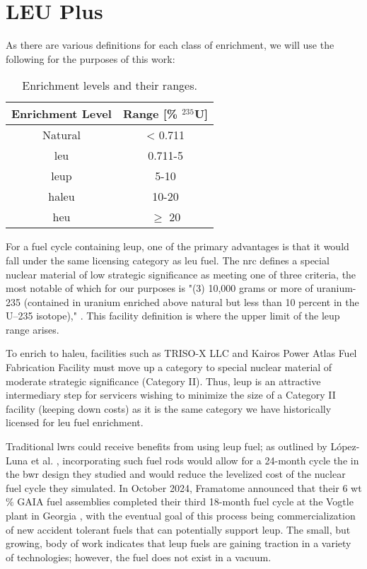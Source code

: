 \section{LEU Plus}
\label{sec:leup}

As there are various definitions for each class of enrichment, we will use the following for the purposes of this work:

\begin{table}[H]
   \centering
   \caption{Enrichment levels and their ranges.}
   \label{tab:enrichment_levels}
   \begin{tabular}{c c}
      \hline
      \textbf{Enrichment Level} & \textbf{Range [\%  $^{235}$U]} \\
      \hline
      Natural & < 0.711 \\
      \gls{leu} & 0.711-5 \\
      \gls{leup} & 5-10 \\
      \gls{haleu} & 10-20 \\
      \gls{heu} & $\geq$ 20  \\
      \hline
   \end{tabular}
\end{table}

For a fuel cycle containing \gls{leup}, one of the primary advantages is that it would fall under the same licensing category as \gls{leu} fuel. The \gls{nrc} defines a special nuclear material of low strategic significance \cite{nrc_catiii} as meeting one of three criteria, the most notable of which for our purposes is "(3) 10,000 grams or more of uranium-235 (contained in uranium enriched above natural but less than 10 percent in the U–235 isotope)," \cite{nrc_catiii}. This facility definition is where the upper limit of the \gls{leup} range arises.

To enrich to \gls{haleu}, facilities such as TRISO-X LLC and Kairos Power Atlas Fuel Fabrication Facility must move up a category to special nuclear material of moderate strategic significance (Category II). Thus, \gls{leup} is an attractive intermediary step for servicers wishing to minimize the size of a Category II facility (keeping down costs) as it is the same category we have historically licensed for \gls{leu} fuel enrichment.

Traditional \glspl{lwr} could receive benefits from using \gls{leup} fuel; as outlined by L\'{o}pez-Luna et al. \cite{24_month_cycle_bwr}, incorporating such fuel rods would allow for a 24-month cycle the in the \gls{bwr} design they studied and would reduce the levelized cost of the nuclear fuel cycle they simulated. In October 2024, Framatome announced that their 6 wt$\%$ GAIA fuel assemblies completed their third 18-month fuel cycle at the Vogtle plant in Georgia \cite{framatome_press_2024}, with the eventual goal of this process being commercialization of new accident tolerant fuels that can potentially support \gls{leup}. The small, but growing, body of work indicates that \gls{leup} fuels are gaining traction in a variety of technologies; however, the fuel does not exist in a vacuum.

